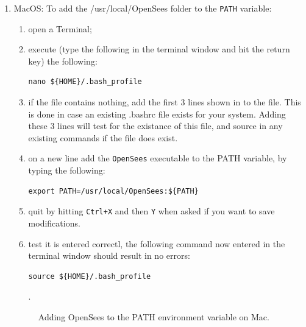 \begin{enumerate}
\item MacOS: To add the /usr/local/OpenSees folder to the \texttt{PATH} variable:

\begin{enumerate}
    \item open a Terminal;
    \item execute (type the following in the terminal window and hit the return key) the following: \begin{verbatim}nano ${HOME}/.bash_profile\end{verbatim}
    \item if the file contains nothing, add the first 3 lines shown in  to the file. This is done in
case an existing .bashrc file exists for your system. Adding these 3 lines will test for the existance of this file, and source in any existing commands if the file does exist.
    \item on a new line add the \texttt{OpenSees} executable to the PATH variable, by typing the following: \begin{verbatim}export PATH=/usr/local/OpenSees:${PATH}\end{verbatim}
    \item quit by hitting \texttt{Ctrl+X} and then \texttt{Y} when asked if you want to save modifications.
    \item test it is entered correctl, the following command now entered in the terminal window should result in no errors: \begin{verbatim}source ${HOME}/.bash_profile\end{verbatim}. 
\end{enumerate}

\begin{figure}[!htbp]
  \caption{Adding OpenSees to the PATH environment variable on Mac.}
  \label{fig:add_env_path_Mac}
\end{figure}


\end{enumerate}


